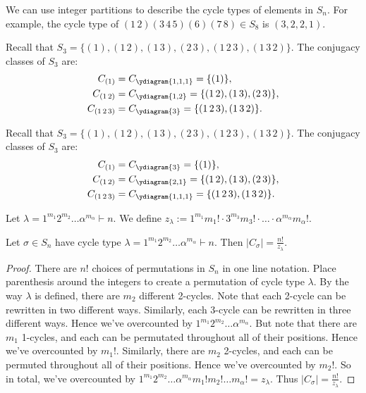 \begin{example}
We can use integer partitions to describe the cycle types of elements in $S_n$. For example, the cycle type of $(1\,2)(3\,4\,5)(6)(7\,8) \in S_8$ is $(3,2,2,1)$.
\end{example}

\begingroup
{}
\begin{example}
    Recall that $S_3 = \{(1),(1\,2),(1\,3),(2\,3),(1\,2\,3),(1\,3\,2)\}$.
    The conjugacy classes of $S_3$ are:
    \begin{align*}
        C_{(1)} &= C_{\ydiagram{1,1,1}} = \{(1)\}, \\
        C_{(1\,2)} &= C_{\ydiagram{1,2}}
        = \{(1\,2),(1\,3),(2\,3)\}, \\
        C_{(1\,2\,3)} &= C_{\ydiagram{3}}
        = \{(1\,2\,3),(1\,3\,2)\}.
    \end{align*}
\end{example}
\endgroup

\begin{example}
	Recall that $S_3 = \{(1),(1\,2),(1\,3),(2\,3),(1\,2\,3),(1\,3\,2)\}$. The conjugacy classes of $S_3$ are:
	\begin{align*}
		C_{(1)} &= C_{\ydiagram{3}} = \{(1)\}, \\
		C_{(1\,2)} &= C_{\ydiagram{2,1}}= \{(1\,2),(1\,3),(2\,3)\}, \\
		C_{(1\,2\,3)} &= C_{\ydiagram{1,1,1}}= \{(1\,2\,3),(1\,3\,2)\}.
	\end{align*}
\end{example}


\begin{definition}
	Let $\lambda = 1^{m_1}2^{m_2}\ldots \alpha^{m_\alpha} \vdash n$. We define $z_\lambda := 1^{m_1}m_1! \cdot 3^{m_3}m_3! \cdot \ldots \cdot \alpha^{m_\alpha}m_\alpha!$.
\end{definition}

\begin{theorem}\label{thm:size-of-C}
	Let $\sigma \in S_n$ have cycle type $\lambda = 1^{m_1}2^{m_2}\ldots \alpha^{m_\alpha} \vdash n$. Then $|C_\sigma| = \frac{n!}{z_\lambda}$.
\end{theorem}
	\begin{proof}
		There are $n!$ choices of permutations in $S_n$ in one line notation. Place parenthesis around the integers to create a permutation of cycle type $\lambda$. By the way $\lambda$ is defined, there are $m_2$ different 2-cycles. Note that each 2-cycle can be rewritten in two different ways. Similarly, each 3-cycle can be rewritten in three different ways. Hence we've overcounted by $1^{m_1}2^{m_2}\ldots \alpha^{m_\alpha}$. But note that there are $m_1$ 1-cycles, and each can be permutated throughout all of their positions. Hence we've overcounted by $m_1!$. Similarly, there are $m_2$ 2-cycles, and each can be permuted throughout all of their positions. Hence we've overcounted by $m_2!$. So in total, we've overcounted by $1^{m_1}2^{m_2}\ldots \alpha^{m_\alpha}m_1!m_2!\ldots m_\alpha! = z_\lambda$. Thus $|C_\sigma| = \frac{n!}{z_\lambda}$.
	\end{proof}

